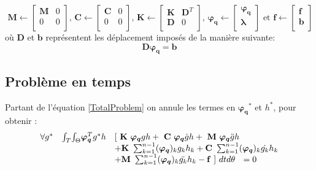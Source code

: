 \documentclass[12pt,a4paper]{report}
\begin{document}
\begin{equation}
~\mathbf{M} \leftarrow
	\begin{bmatrix}
	   \mathbf{M} & 0 \\
	   0 & 0 \\
	\end{bmatrix}
	\textrm{,  }
	\mathbf{C} \leftarrow
	\begin{bmatrix}
	   \mathbf{C} & 0 \\
	   0 & 0 \\
	\end{bmatrix}
	\textrm{,  } 
	\mathbf{K} \leftarrow
	\begin{bmatrix}
	   \mathbf{K} & \mathbf{D}^T \\
	   \mathbf{D} & 0 \\
	\end{bmatrix}
	\textrm{,  }
	\boldsymbol{\varphi_q} \leftarrow
	\begin{bmatrix}
	   \boldsymbol{\varphi_q} \\
	   \boldsymbol{\lambda}\\
	\end{bmatrix}
	\textrm{ et }
	\mathbf{f} \leftarrow
	\begin{bmatrix}
	   \mathbf{f} \\
	   \mathbf{b} \\
	\end{bmatrix}
\end{equation}
où $\mathbf{D}$ et $\mathbf{b}$ représentent les déplacement imposés de la manière suivante:
\[ \mathbf{D} \boldsymbol{\varphi_q}= \mathbf{b} \]

\subsection{Problème en temps}

Partant de l'équation \ref{TotalProblem} on annule les termes en $\boldsymbol{\varphi_q}^*$ et $h^*$, pour obtenir :
\begin{equation}
\begin{array}{r r l}
	\forall g^*
	&\int_T \! \int_\Theta \!  \boldsymbol{\varphi_q}^Tg^*h &
						[~\mathbf{K}~ \boldsymbol{\varphi_q}gh
						+ ~\mathbf{C}~ \boldsymbol{\varphi_q} \dot{g}h 
						+ ~\mathbf{M}~ \boldsymbol{\varphi_q} \ddot{g}h
	\\ &&
			+ \mathbf{K}~ \sum_{k=1}^{n-1} (\boldsymbol{\varphi_q})_k       g_k  h_k 
			+  \mathbf{C}~ \sum_{k=1}^{n-1} (\boldsymbol{\varphi_q})_k  \dot{g_k} h_k 
	\\ &&
			+  \mathbf{M}~ \sum_{k=1}^{n-1} (\boldsymbol{\varphi_q})_k \ddot{g_k} h_k
			-\mathbf{f}~] ~dt d\theta ~~=0
\end{array}
\end{equation}
\end{document}
